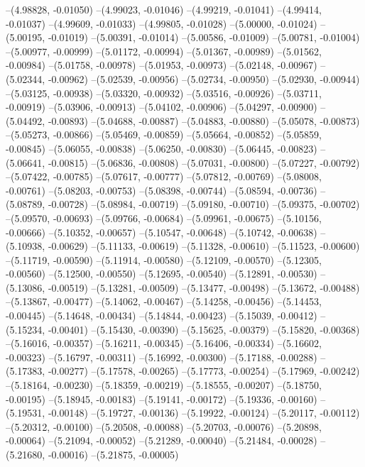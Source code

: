 --(4.98828, -0.01050)
--(4.99023, -0.01046)
--(4.99219, -0.01041)
--(4.99414, -0.01037)
--(4.99609, -0.01033)
--(4.99805, -0.01028)
--(5.00000, -0.01024)
--(5.00195, -0.01019)
--(5.00391, -0.01014)
--(5.00586, -0.01009)
--(5.00781, -0.01004)
--(5.00977, -0.00999)
--(5.01172, -0.00994)
--(5.01367, -0.00989)
--(5.01562, -0.00984)
--(5.01758, -0.00978)
--(5.01953, -0.00973)
--(5.02148, -0.00967)
--(5.02344, -0.00962)
--(5.02539, -0.00956)
--(5.02734, -0.00950)
--(5.02930, -0.00944)
--(5.03125, -0.00938)
--(5.03320, -0.00932)
--(5.03516, -0.00926)
--(5.03711, -0.00919)
--(5.03906, -0.00913)
--(5.04102, -0.00906)
--(5.04297, -0.00900)
--(5.04492, -0.00893)
--(5.04688, -0.00887)
--(5.04883, -0.00880)
--(5.05078, -0.00873)
--(5.05273, -0.00866)
--(5.05469, -0.00859)
--(5.05664, -0.00852)
--(5.05859, -0.00845)
--(5.06055, -0.00838)
--(5.06250, -0.00830)
--(5.06445, -0.00823)
--(5.06641, -0.00815)
--(5.06836, -0.00808)
--(5.07031, -0.00800)
--(5.07227, -0.00792)
--(5.07422, -0.00785)
--(5.07617, -0.00777)
--(5.07812, -0.00769)
--(5.08008, -0.00761)
--(5.08203, -0.00753)
--(5.08398, -0.00744)
--(5.08594, -0.00736)
--(5.08789, -0.00728)
--(5.08984, -0.00719)
--(5.09180, -0.00710)
--(5.09375, -0.00702)
--(5.09570, -0.00693)
--(5.09766, -0.00684)
--(5.09961, -0.00675)
--(5.10156, -0.00666)
--(5.10352, -0.00657)
--(5.10547, -0.00648)
--(5.10742, -0.00638)
--(5.10938, -0.00629)
--(5.11133, -0.00619)
--(5.11328, -0.00610)
--(5.11523, -0.00600)
--(5.11719, -0.00590)
--(5.11914, -0.00580)
--(5.12109, -0.00570)
--(5.12305, -0.00560)
--(5.12500, -0.00550)
--(5.12695, -0.00540)
--(5.12891, -0.00530)
--(5.13086, -0.00519)
--(5.13281, -0.00509)
--(5.13477, -0.00498)
--(5.13672, -0.00488)
--(5.13867, -0.00477)
--(5.14062, -0.00467)
--(5.14258, -0.00456)
--(5.14453, -0.00445)
--(5.14648, -0.00434)
--(5.14844, -0.00423)
--(5.15039, -0.00412)
--(5.15234, -0.00401)
--(5.15430, -0.00390)
--(5.15625, -0.00379)
--(5.15820, -0.00368)
--(5.16016, -0.00357)
--(5.16211, -0.00345)
--(5.16406, -0.00334)
--(5.16602, -0.00323)
--(5.16797, -0.00311)
--(5.16992, -0.00300)
--(5.17188, -0.00288)
--(5.17383, -0.00277)
--(5.17578, -0.00265)
--(5.17773, -0.00254)
--(5.17969, -0.00242)
--(5.18164, -0.00230)
--(5.18359, -0.00219)
--(5.18555, -0.00207)
--(5.18750, -0.00195)
--(5.18945, -0.00183)
--(5.19141, -0.00172)
--(5.19336, -0.00160)
--(5.19531, -0.00148)
--(5.19727, -0.00136)
--(5.19922, -0.00124)
--(5.20117, -0.00112)
--(5.20312, -0.00100)
--(5.20508, -0.00088)
--(5.20703, -0.00076)
--(5.20898, -0.00064)
--(5.21094, -0.00052)
--(5.21289, -0.00040)
--(5.21484, -0.00028)
--(5.21680, -0.00016)
--(5.21875, -0.00005)

